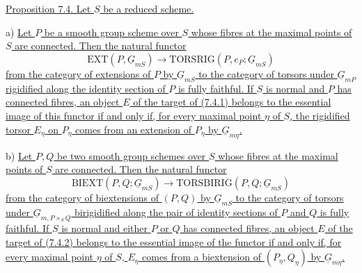 
\medskip
\noindent\underline{Proposition 7.4.  Let $S$ be a reduced scheme.}

\smallskip
\noindent a) \underline{Let $P$ be a smooth group scheme over $S$ whose
fibres at the maximal points of $S$ are connected.  Then the natural
functor}
\begin{equation}\tag{7.4.1}
 \mathrm{EXT}(P,\underline G_{mS})
 \longrightarrow
 \mathrm{TORSRIG}(P,e_P;\underline G_{mS})
\end{equation}
\underline{from the category of extensions of $P$ by $\underline G_{mS}$
to the category of torsors under $\underline G_{mP}$ rigidified along the
identity section of $P$ is fully faithful.  If $S$ is normal and $P$ has
connected fibres, an object $E$ of the target of (7.4.1) belongs to the
essential image of this functor if and only if, for every maximal point
$\eta$ of $S$, the rigidified torsor $E_\eta$ on $P_\eta$ comes from an
extension of $P_\eta$ by $\underline G_{m\eta}$.}

\smallskip
\noindent b) \underline{Let $P,Q$ be two smooth group schemes over $S$
whose fibres at the maximal points of $S$ are connected.  Then the natural
functor}
\begin{equation}\tag{7.4.2}
 \mathrm{BIEXT}(P,Q;\underline G_{mS})
 \longrightarrow
 \mathrm{TORSBIRIG}(P,Q;\underline G_{mS})
\end{equation}
\underline{from the category of biextensions of $(P,Q)$ by
$\underline G_{mS}$ to the category of torsors under
$\underline G_{m,P\times_S Q}$ birigidified along the pair of identity
sections of $P$ and $Q$ is fully faithful.  If $S$ is normal and either $P$
or $Q$ has connected fibres, an object $E$ of the target of (7.4.2) belongs
to the essential image of the functor if and only if, for every maximal
point $\eta$ of $S$, $E_\eta$ comes from a biextension of
$(P_\eta,Q_\eta)$ by $\underline G_{m\eta}$.}

